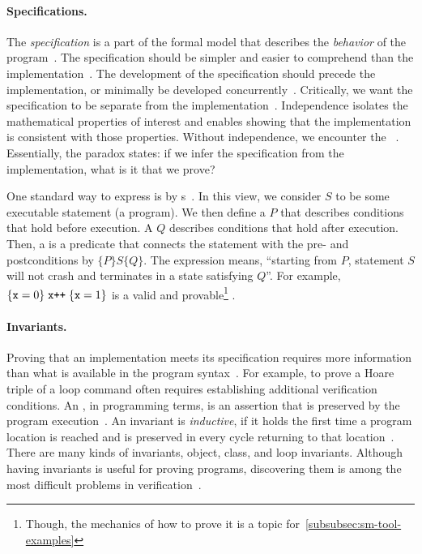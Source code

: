 \paragraph*{Specifications.} The \emph{specification}
is a part of the formal model that describes the \emph{behavior} of the
program~\cite{zave2023b}. The specification should be simpler and easier to
comprehend than the implementation~\cite{zave2023b}. The development of the
specification should precede the implementation, or minimally be developed
concurrently~\cite{dijkstra1972}. Critically, we want the specification to be
{separate} from the implementation~\cite{furia2014b}. Independence isolates the
mathematical properties of interest and enables showing that the implementation
is consistent with those properties. Without independence, we encounter the
\emph{}~\cite{furia2014b}. Essentially, the
paradox states: if we infer the specification from the implementation, what is
it that we prove?

One standard way to express  is by s~\cite{hoare1969}. In this view, we consider \(S\) to be some executable
statement (a program). We then define a \emph{}
\(P\) that describes conditions that hold before execution. A
\emph{} \(Q\) describes conditions that hold
after execution. Then, a \emph{} is a predicate that connects
the statement with the pre- and postconditions by \(\{P\} S
\{Q\}\). The expression means, \enquote{starting from
\(P\), statement \(S\) will not crash and terminates in a state
satisfying \(Q\)}. For example, \(\{ \prm{x}=0 \}\;\prm{x++}\;\{
\prm{x}=1\}\) is a valid and provable\footnote{ Though, the
mechanics of {how} to prove it is a topic
for~\autoref{subsubsec:sm-tool-examples}} .

\paragraph*{Invariants.}
Proving that an implementation meets its specification requires more information than what is available in the program syntax~\cite{chang2005}.
For example, to prove a Hoare triple of a loop command often requires establishing additional verification conditions.
An \emph{}, in programming terms, is an assertion that is preserved by the program execution~\cite{furia2014}.
An invariant is \emph{inductive},
if it holds the first time a program location is reached and is preserved in every cycle returning to that location~\cite{sankaranarayanan2004}.
There are many kinds of invariants, \eg object, class, and loop invariants.
Although having invariants is useful for proving programs, discovering them is among the most difficult problems in verification~\cite{dillig2013,yu2023}.


